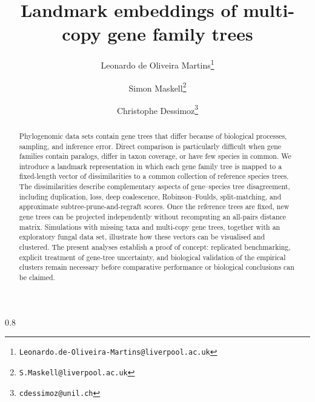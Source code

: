 \documentclass[pdftex,12pt,a4paper,openany,fleqn]{article}
\title{Landmark embeddings of multi-copy gene family trees}
\author[1]{Leonardo de Oliveira Martins\thanks{{\tt Leonardo.de-Oliveira-Martins@liverpool.ac.uk}}}
\author[1]{Simon Maskell\thanks{{\tt S.Maskell@liverpool.ac.uk}}}
\author[2]{Christophe Dessimoz\thanks{{\tt cdessimoz@unil.ch}}}
\affil[1]{Department of Electrical Engineering and Electronics, University of Liverpool}
\affil[2]{UNIL}
\date{\vspace{-5ex}}
\begin{document}
\maketitle

\begin{abstract}
Phylogenomic data sets contain gene trees that differ because of biological processes, sampling, and inference error.
Direct comparison is particularly difficult when gene families contain paralogs, differ in taxon coverage, or have few
species in common. We introduce a landmark representation in which each gene family tree is mapped to a fixed-length
vector of dissimilarities to a common collection of reference species trees. The dissimilarities describe complementary
aspects of gene--species tree disagreement, including duplication, loss, deep coalescence, Robinson--Foulds,
split-matching, and approximate subtree-prune-and-regraft scores. Once the reference trees are fixed, new gene trees can
be projected independently without recomputing an all-pairs distance matrix. Simulations with missing taxa and
multi-copy gene trees, together with an exploratory fungal data set, illustrate how these vectors can be visualised and
clustered. The present analyses establish a proof of concept: replicated benchmarking, explicit treatment of gene-tree
uncertainty, and biological validation of the empirical clusters remain necessary before comparative performance or
biological conclusions can be claimed.
\end{abstract}

\begin{spacing}{0.8}  \end{spacing}
\end{document}
